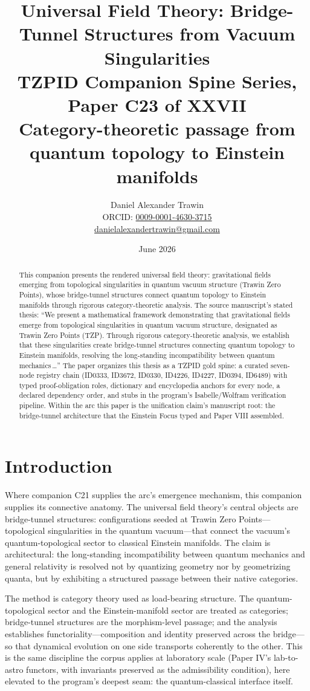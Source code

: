 \documentclass[11pt]{article}
\title{Universal Field Theory: Bridge-Tunnel Structures from Vacuum Singularities\\[0.6em]
\large TZPID Companion Spine Series, Paper C23 of XXVII\\
\normalsize Category-theoretic passage from quantum topology to Einstein manifolds}
\author{Daniel Alexander Trawin\\
\small ORCID: \href{https://orcid.org/0009-0001-4630-3715}{0009-0001-4630-3715}\\
\small \href{mailto:danielalexandertrawin@gmail.com}{danielalexandertrawin@gmail.com}}
\date{June 2026}
\theoremstyle{remark}
\begin{document}
\maketitle

\begin{abstract}
This companion presents the rendered universal field theory: gravitational fields emerging from topological singularities in quantum vacuum structure (Trawin Zero Points), whose bridge-tunnel structures connect quantum topology to Einstein manifolds through rigorous category-theoretic analysis.
The source manuscript's stated thesis: ``We present a mathematical framework demonstrating that gravitational fields emerge from topological singularities in quantum vacuum structure, designated as Trawin Zero Points (TZP). Through rigorous category-theoretic analysis, we establish that these singularities create bridge-tunnel structures connecting quantum topology to Einstein manifolds, resolving the long-standing incompatibility between quantum mechanics\,\ldots'' The paper organizes this thesis as a TZPID gold spine: a curated seven-node registry chain (ID0333, ID3672, ID0330, ID4226, ID4227, ID0394, ID6489) with typed proof-obligation roles, dictionary and encyclopedia anchors for every node, a declared dependency order, and stubs in the program's Isabelle/Wolfram verification pipeline. Within the arc this paper is the unification claim's manuscript root: the bridge-tunnel architecture that the Einstein Focus typed and Paper VIII assembled.
\end{abstract}

\section{Introduction}
\label{sec:intro}

Where companion C21 supplies the arc's emergence mechanism, this companion supplies its connective anatomy. The universal field theory's central objects are bridge-tunnel structures: configurations seeded at Trawin Zero Points---topological singularities in the quantum vacuum---that connect the vacuum's quantum-topological sector to classical Einstein manifolds. The claim is architectural: the long-standing incompatibility between quantum mechanics and general relativity is resolved not by quantizing geometry nor by geometrizing quanta, but by exhibiting a structured passage between their native categories.

The method is category theory used as load-bearing structure. The quantum-topological sector and the Einstein-manifold sector are treated as categories; bridge-tunnel structures are the morphism-level passage; and the analysis establishes functoriality---composition and identity preserved across the bridge---so that dynamical evolution on one side transports coherently to the other. This is the same discipline the corpus applies at laboratory scale (Paper IV's lab-to-astro functors, with invariants preserved as the admissibility condition), here elevated to the program's deepest seam: the quantum-classical interface itself.
\end{document}
